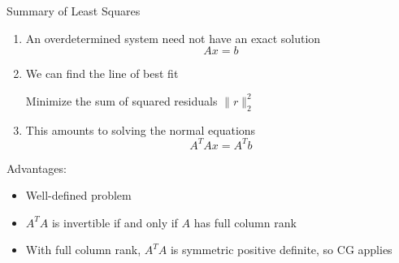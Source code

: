 \documentclass[10pt]{beamer}
\begin{document}

\begin{frame}{Summary of Least Squares}

\begin{enumerate}

    \item An overdetermined system need not have an exact solution 
        $$Ax=b$$
    
    \item We can find the line of best fit \bigskip 

        Minimize the sum of squared residuals $\|r\|_2^2$ \bigskip

    \item This amounts to solving the normal equations 
        $$A^TAx = A^Tb $$ 
\end{enumerate}
Advantages: 
\begin{itemize}
    \item Well-defined problem 
    \item $A^TA$ is invertible if and only if $A$ has full column rank
    \item With full column rank, $A^TA$ is symmetric positive definite, so CG applies
\end{itemize}
    
\end{frame}
\end{document}
